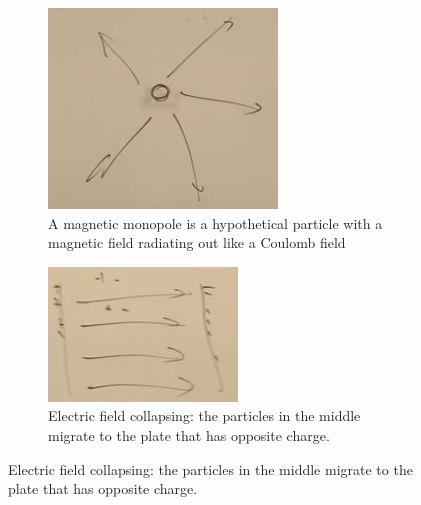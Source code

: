 \documentclass[]{article}
\begin{document}
\begin{figure}[H]
	\caption{A magnetic monopole radiating like a Coulomb field}
	\begin{subfigure}[t]{0.54\textwidth}
		\caption{A magnetic monopole is a hypothetical particle with a magnetic field radiating out like a Coulomb field}
		\includegraphics[width=\textwidth]{cosmo-9-magnetic-monopole}
	\end{subfigure}
	\begin{subfigure}[t]{0.54\textwidth}
		\caption{Electric field collapsing: the particles in the middle migrate to the plate that has opposite charge.}\label{fig:cosmo-9-capacitor}
		\includegraphics[width=\textwidth]{cosmo-9-capacitor}
	\end{subfigure}
\end{figure}
\end{document}
